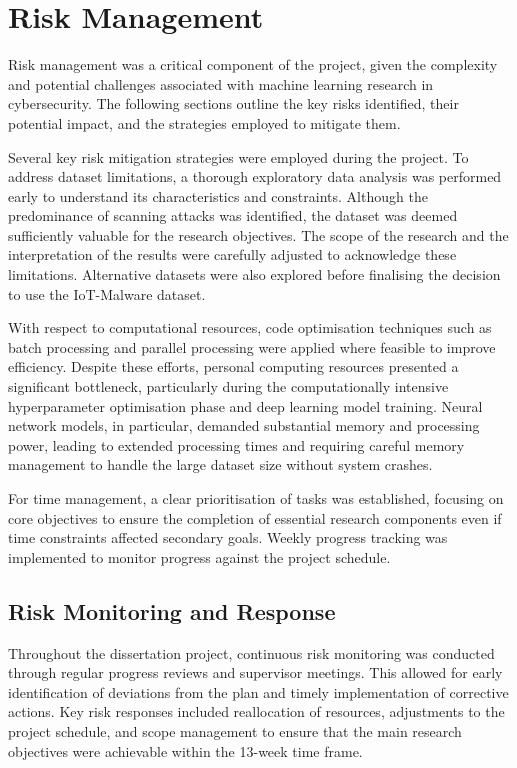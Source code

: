 \section{Risk Management}

Risk management was a critical component of the project, given the complexity and potential challenges associated with machine learning research in cybersecurity. The following sections outline the key risks identified, their potential impact, and the strategies employed to mitigate them.

Several key risk mitigation strategies were employed during the project. To address dataset limitations, a thorough exploratory data analysis was performed early to understand its characteristics and constraints. Although the predominance of scanning attacks was identified, the dataset was deemed sufficiently valuable for the research objectives. The scope of the research and the interpretation of the results were carefully adjusted to acknowledge these limitations. Alternative datasets were also explored before finalising the decision to use the IoT-Malware dataset.

With respect to computational resources, code optimisation techniques such as batch processing and parallel processing were applied where feasible to improve efficiency. Despite these efforts, personal computing resources presented a significant bottleneck, particularly during the computationally intensive hyperparameter optimisation phase and deep learning model training. Neural network models, in particular, demanded substantial memory and processing power, leading to extended processing times and requiring careful memory management to handle the large dataset size without system crashes.

For time management, a clear prioritisation of tasks was established, focusing on core objectives to ensure the completion of essential research components even if time constraints affected secondary goals. Weekly progress tracking was implemented to monitor progress against the project schedule.

\subsection{Risk Monitoring and Response}

Throughout the dissertation project, continuous risk monitoring was conducted through regular progress reviews and supervisor meetings. This allowed for early identification of deviations from the plan and timely implementation of corrective actions. Key risk responses included reallocation of resources, adjustments to the project schedule, and scope management to ensure that the main research objectives were achievable within the 13-week time frame.

